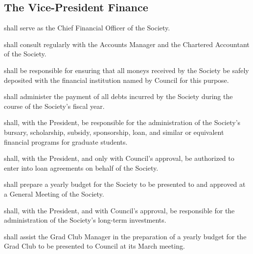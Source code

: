 \subsection {The Vice-President Finance} 
\begin{longenum}[ label*=\thesubsection.\arabic*., align=left]
	\item shall serve as the Chief Financial Officer of the Society.
    \item shall consult regularly with the Accounts Manager and the Chartered Accountant of the Society.
    \item shall be responsible for ensuring that all moneys received by the Society be safely deposited with the financial institution named by Council for this purpose.
    \item shall administer the payment of all debts incurred by the Society during the course of the Society's fiscal year.
    \item shall, with the President, be responsible for the administration of the Society's bursary, scholarship, subsidy, sponsorship, loan, and similar or equivalent financial programs for graduate students.
    \item shall, with the President, and only with Council's approval, be authorized to enter into loan agreements on behalf of the Society. 
    \item shall prepare a yearly budget for the Society to be presented to and approved at a General Meeting of the Society.
    \item shall, with the President, and with Council's approval, be responsible for the administration of the Society's long-term investments.
    \item shall assist the Grad Club Manager in the preparation of a yearly budget for the Grad Club to be presented to Council at its March meeting. 

\end{longenum}
